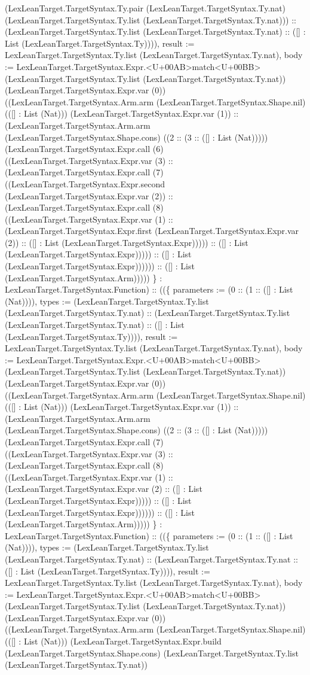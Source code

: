 \documentclass[11pt]{article}
\begin{document}
(LexLeanTarget.TargetSyntax.Ty.pair (LexLeanTarget.TargetSyntax.Ty.nat) (LexLeanTarget.TargetSyntax.Ty.list (LexLeanTarget.TargetSyntax.Ty.nat))) :: (LexLeanTarget.TargetSyntax.Ty.list (LexLeanTarget.TargetSyntax.Ty.nat) :: ([] : List (LexLeanTarget.TargetSyntax.Ty)))), result := LexLeanTarget.TargetSyntax.Ty.list (LexLeanTarget.TargetSyntax.Ty.nat), body := LexLeanTarget.TargetSyntax.Expr.<U+00AB>match<U+00BB> (LexLeanTarget.TargetSyntax.Ty.list (LexLeanTarget.TargetSyntax.Ty.nat)) (LexLeanTarget.TargetSyntax.Expr.var (0)) ((LexLeanTarget.TargetSyntax.Arm.arm (LexLeanTarget.TargetSyntax.Shape.nil) (([] : List (Nat))) (LexLeanTarget.TargetSyntax.Expr.var (1)) :: (LexLeanTarget.TargetSyntax.Arm.arm (LexLeanTarget.TargetSyntax.Shape.cons) ((2 :: (3 :: ([] : List (Nat))))) (LexLeanTarget.TargetSyntax.Expr.call (6) ((LexLeanTarget.TargetSyntax.Expr.var (3) :: (LexLeanTarget.TargetSyntax.Expr.call (7) ((LexLeanTarget.TargetSyntax.Expr.second (LexLeanTarget.TargetSyntax.Expr.var (2)) :: (LexLeanTarget.TargetSyntax.Expr.call (8) ((LexLeanTarget.TargetSyntax.Expr.var (1) :: (LexLeanTarget.TargetSyntax.Expr.first (LexLeanTarget.TargetSyntax.Expr.var (2)) :: ([] : List (LexLeanTarget.TargetSyntax.Expr))))) :: ([] : List (LexLeanTarget.TargetSyntax.Expr))))) :: ([] : List (LexLeanTarget.TargetSyntax.Expr)))))) :: ([] : List (LexLeanTarget.TargetSyntax.Arm))))) \} : LexLeanTarget.TargetSyntax.Function) :: ((\{ parameters := (0 :: (1 :: ([] : List (Nat)))), types := (LexLeanTarget.TargetSyntax.Ty.list (LexLeanTarget.TargetSyntax.Ty.nat) :: (LexLeanTarget.TargetSyntax.Ty.list (LexLeanTarget.TargetSyntax.Ty.nat) :: ([] : List (LexLeanTarget.TargetSyntax.Ty)))), result := LexLeanTarget.TargetSyntax.Ty.list (LexLeanTarget.TargetSyntax.Ty.nat), body := LexLeanTarget.TargetSyntax.Expr.<U+00AB>match<U+00BB> (LexLeanTarget.TargetSyntax.Ty.list (LexLeanTarget.TargetSyntax.Ty.nat)) (LexLeanTarget.TargetSyntax.Expr.var (0)) ((LexLeanTarget.TargetSyntax.Arm.arm (LexLeanTarget.TargetSyntax.Shape.nil) (([] : List (Nat))) (LexLeanTarget.TargetSyntax.Expr.var (1)) :: (LexLeanTarget.TargetSyntax.Arm.arm (LexLeanTarget.TargetSyntax.Shape.cons) ((2 :: (3 :: ([] : List (Nat))))) (LexLeanTarget.TargetSyntax.Expr.call (7) ((LexLeanTarget.TargetSyntax.Expr.var (3) :: (LexLeanTarget.TargetSyntax.Expr.call (8) ((LexLeanTarget.TargetSyntax.Expr.var (1) :: (LexLeanTarget.TargetSyntax.Expr.var (2) :: ([] : List (LexLeanTarget.TargetSyntax.Expr))))) :: ([] : List (LexLeanTarget.TargetSyntax.Expr)))))) :: ([] : List (LexLeanTarget.TargetSyntax.Arm))))) \} : LexLeanTarget.TargetSyntax.Function) :: ((\{ parameters := (0 :: (1 :: ([] : List (Nat)))), types := (LexLeanTarget.TargetSyntax.Ty.list (LexLeanTarget.TargetSyntax.Ty.nat) :: (LexLeanTarget.TargetSyntax.Ty.nat :: ([] : List (LexLeanTarget.TargetSyntax.Ty)))), result := LexLeanTarget.TargetSyntax.Ty.list (LexLeanTarget.TargetSyntax.Ty.nat), body := LexLeanTarget.TargetSyntax.Expr.<U+00AB>match<U+00BB> (LexLeanTarget.TargetSyntax.Ty.list (LexLeanTarget.TargetSyntax.Ty.nat)) (LexLeanTarget.TargetSyntax.Expr.var (0)) ((LexLeanTarget.TargetSyntax.Arm.arm (LexLeanTarget.TargetSyntax.Shape.nil) (([] : List (Nat))) (LexLeanTarget.TargetSyntax.Expr.build (LexLeanTarget.TargetSyntax.Shape.cons) (LexLeanTarget.TargetSyntax.Ty.list (LexLeanTarget.TargetSyntax.Ty.nat)) 
\end{document}
